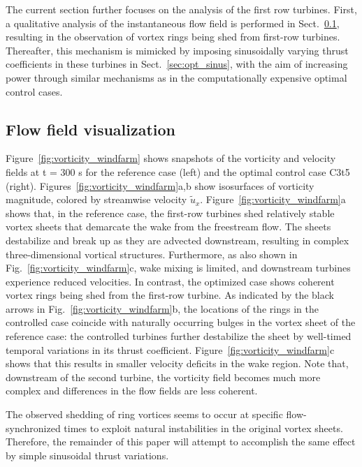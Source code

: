 \documentclass[wes, manuscript]{copernicus}
\begin{document}
The current section further focuses on the analysis of the first row turbines. First, a qualitative analysis of the instantaneous flow field is performed in Sect.~\ref{sec:opt_visualization}, resulting in the observation of vortex rings being shed from first-row turbines. Thereafter, this mechanism is mimicked by imposing sinusoidally varying thrust coefficients in these turbines in Sect.~\ref{sec:opt_sinus}, with the aim of increasing power through similar mechanisms as in the computationally expensive optimal control cases.

\subsection{Flow field visualization}\label{sec:opt_visualization}
Figure~\ref{fig:vorticity_windfarm} shows snapshots of the vorticity and velocity fields at t = 300 s for the reference case (left) and the optimal control case C3t5 (right). Figures~\ref{fig:vorticity_windfarm}a,b show isosurfaces of vorticity magnitude, colored by streamwise velocity $\widetilde{u}_x$. Figure~\ref{fig:vorticity_windfarm}a shows that, in the reference case, the first-row turbines shed relatively stable vortex sheets that demarcate the wake from the freestream flow. The sheets destabilize and break up as they are advected downstream, resulting in complex three-dimensional vortical structures. Furthermore, as also shown in Fig.~\ref{fig:vorticity_windfarm}c, wake mixing is limited, and downstream turbines experience reduced velocities. In contrast, the optimized case shows coherent vortex rings being shed from the first-row turbine. As indicated by the black arrows in Fig.~\ref{fig:vorticity_windfarm}b, the locations of the rings in the controlled case coincide with naturally occurring bulges in the vortex sheet of the reference case: the controlled turbines further destabilize the sheet by well-timed temporal variations in its thrust coefficient. Figure~\ref{fig:vorticity_windfarm}c shows that this results in smaller velocity deficits in the wake region. Note that, downstream of the second turbine, the vorticity field becomes much more complex and differences in the flow fields are less coherent. 

The observed shedding of ring vortices seems to occur at specific flow-synchronized times to exploit natural instabilities in the original vortex sheets. Therefore, the remainder of this paper will attempt to accomplish the same effect by simple sinusoidal thrust variations. 
\end{document}
